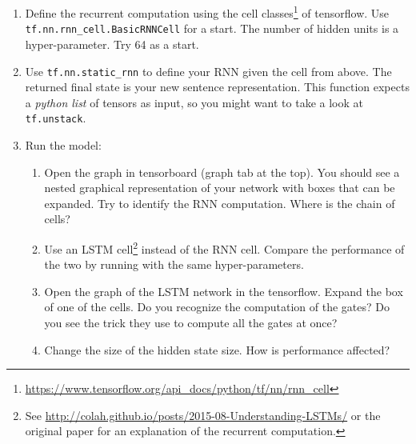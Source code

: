 \documentclass{article}
\begin{document}
\begin{enumerate}
	\item Define the recurrent computation using the cell classes\footnote{\url{https://www.tensorflow.org/api\_docs/python/tf/nn/rnn\_cell}} of tensorflow. Use \texttt{ tf.nn.rnn\_cell.BasicRNNCell} for a start. The number of hidden units is a hyper-parameter. Try 64 as a start.
	
	\item Use \texttt{tf.nn.static\_rnn} to define your RNN given the cell from above. The returned final state is your new sentence representation. This function expects a \emph{python list} of tensors as input, so you might want to take a look at \texttt{tf.unstack}.
	\item Run the model: 
	\begin{enumerate}
	\item Open the graph in tensorboard (graph tab at the top). You should see a nested graphical representation of your network with boxes that can be expanded. Try to identify the RNN computation. Where is the chain of cells? 
	\item Use an LSTM cell\footnote{See \url{http://colah.github.io/posts/2015-08-Understanding-LSTMs/} or the original paper\cite{hochreiter1997} for an explanation of the recurrent computation.} instead of the RNN cell. Compare the performance of the two by running with the same hyper-parameters.
	\item Open the graph of the LSTM network in the tensorflow. Expand the box of one of the cells. Do you recognize the computation of the gates? Do you see the trick they use to compute all the gates at once?
	\item Change the size of the hidden state size. How is performance affected?
	\end{enumerate}
\end{enumerate}




\end{document}

